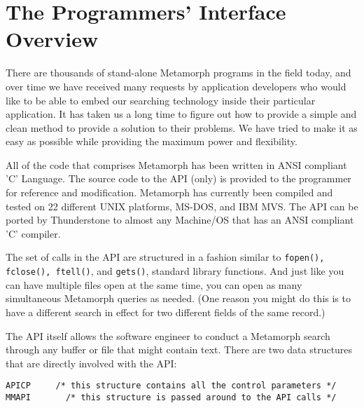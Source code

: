 \chapter{The Programmers' Interface Overview}

There are thousands of stand-alone Metamorph programs in the field
today, and over time we have received many requests by application
developers who would like to be able to embed our searching
technology inside their particular application.  It has taken us a
long time to figure out how to provide a simple and clean method
to provide a solution to their problems.  We have tried to make it
as easy as possible while providing the maximum power and
flexibility.

All of the code that comprises Metamorph has been written in ANSI
compliant 'C' Language.  The source code to the API (only) is
provided to the programmer for reference and modification.
Metamorph has currently been compiled and tested on 22 different
UNIX platforms, MS-DOS, and IBM MVS. The API can be ported by
Thunderstone to almost any Machine/OS that has an ANSI compliant
'C' compiler.

The set of calls in the API are structured in a fashion similar to
\verb`fopen(), fclose(), ftell()`, and \verb`gets()`, standard library
functions.  And just like you can have multiple files open at the
same time, you can open as many simultaneous Metamorph queries as
needed.  (One reason you might do this is to have a different
search in effect for two different fields of the same record.)

The API itself allows the software engineer to conduct a Metamorph
search through any buffer or file that might contain text.  There
are two data structures that are directly involved with the API:

\begin{verbatim}
APICP     /* this structure contains all the control parameters */
MMAPI       /* this structure is passed around to the API calls */
\end{verbatim}

